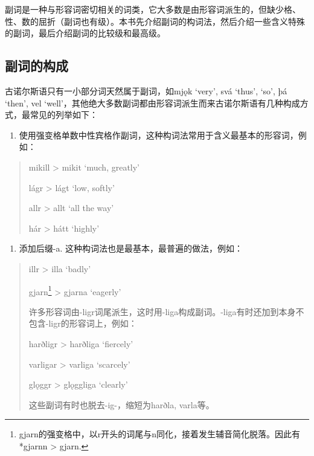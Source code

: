 副词是一种与形容词密切相关的词类，它大多数是由形容词派生的，但缺少格、性、数的屈折（副词也有级）。本书先介绍副词的构词法，然后介绍一些含义特殊的副词，最后介绍副词的比较级和最高级。

\subsection{副词的构成}\label{副词的构成}

古诺尔斯语只有一小部分词天然属于副词，如mjǫk `very', svá `thus', `so',
þá `then', vel
`well'，其他绝大多数副词都由形容词派生而来古诺尔斯语有几种构成方式，最常见的列举如下：

\begin{enumerate}
  \def\labelenumi{\arabic{enumi})}
  \item
        使用强变格单数中性宾格作副词，这种构词法常用于含义最基本的形容词，例如：
\end{enumerate}

\begin{quote}
  mikill \textgreater{} mikit `much, greatly‌'

  lágr \textgreater{} lágt `low, softly‌'

  allr \textgreater{} allt `all the way‌'

  hár \textgreater{} hátt `highly‌'
\end{quote}

\begin{enumerate}
  \def\labelenumi{\arabic{enumi})}
  \setcounter{enumi}{1}
  \item
        添加后缀-a. 这种构词法也是最基本，最普遍的做法，例如：
\end{enumerate}

\begin{quote}
  illr \textgreater{} illa `badly‌'

  gjarn\footnote{gjarn的强变格中，以r开头的词尾与n同化，接着发生辅音简化脱落。因此有*gjarnn
    \textgreater{} gjarn.} \textgreater{} gjarna `eagerly‌'

  许多形容词由-ligr词尾派生，这时用-liga构成副词。-liga有时还加到本身不包含-ligr的形容词上，例如：

  harðligr \textgreater{} harðliga `fiercely‌'

  varligar \textgreater{} varliga `scarcely‌'

  glǫggr \textgreater{} glǫggliga `clearly'

  这些副词有时也脱去-ig-，缩短为harðla, varla等。
\end{quote}

